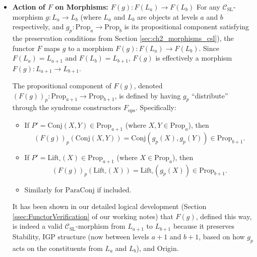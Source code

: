 \documentclass[
    12pt,              %
    a4paper,           %
    headings=normal,   %
    twoside=true,      %
    BCOR=8mm,          %
]{scrbook}
\newcommand{\q}[1]{\enquote{#1}}
\newcommand{\BoxSyn}{\square}
\newcommand{\fops}{F_{\text{ops}}}
\begin{document}
\begin{itemize}
\begin{enumerate}[label=(\roman*)]
            \item  \textbf{\(\text{Origin}_{k+1}\):} For any \(P' \in \text{Prop}_{k+1}\),
                \[ \text{Origin}_{k+1}(P') = \bigcup \{ \text{Origin}_k(X) \mid X \in \text{Prop}_k \land \text{IGP}_{k+1}(X, P') \}. \]
        \end{enumerate}
        This defines the mapping \(F(L_k) = L_{k+1}\) precisely.

    \item   \textbf{Action of \(F\) on Morphisms: \(F(g): F(L_a) \to F(L_b)\)}
        For any \(\mathcal{C}_{\text{SL}}\)-morphism \(g: L_a \to L_b\) (where \(L_a\) and \(L_b\) are objects at levels \(a\) and \(b\) respectively, and \(g_p: \text{Prop}_a \to \text{Prop}_b\) is its propositional component satisfying the preservation conditions from Section \ref{sec:ch2_morphisms_csl}), the functor \(F\) maps \(g\) to a morphism \(F(g): F(L_a) \to F(L_b)\). Since \(F(L_a) = L_{a+1}\) and \(F(L_b) = L_{b+1}\), \(F(g)\) is effectively a morphism \(F(g): L_{a+1} \to L_{b+1}\).

        The propositional component of \(F(g)\), denoted \((F(g))_p: \text{Prop}_{a+1} \to \text{Prop}_{b+1}\), is defined by having \(g_p\) \q{distribute} through the syndrome constructors \(\fops\). Specifically:
        \begin{itemize}
            \item   If \(P' = \text{Conj}(X,Y) \in \text{Prop}_{a+1}\) (where \(X,Y \in \text{Prop}_a\)), then
                \[ (F(g))_p(\text{Conj}(X,Y)) = \text{Conj}(g_p(X), g_p(Y)) \in \text{Prop}_{b+1}. \]
            \item   If \(P' = \text{Lift}_\BoxSyn(X) \in \text{Prop}_{a+1}\) (where \(X \in \text{Prop}_a\)), then
                \[ (F(g))_p(\text{Lift}_\BoxSyn(X)) = \text{Lift}_\BoxSyn(g_p(X)) \in \text{Prop}_{b+1}. \]
            \item   Similarly for \(\text{ParaConj}\) if included.
        \end{itemize}
        It has been shown in our detailed logical development (Section \ref{ssec:FunctorVerification} of our working notes) that \(F(g)\), defined this way, is indeed a valid \(\mathcal{C}_{\text{SL}}\)-morphism from \(L_{a+1}\) to \(L_{b+1}\) because it preserves Stability, IGP structure (now between levels \(a+1\) and \(b+1\), based on how \(g_p\) acts on the constituents from \(L_a\) and \(L_b\)), and Origin.


\end{itemize}
\end{document}
